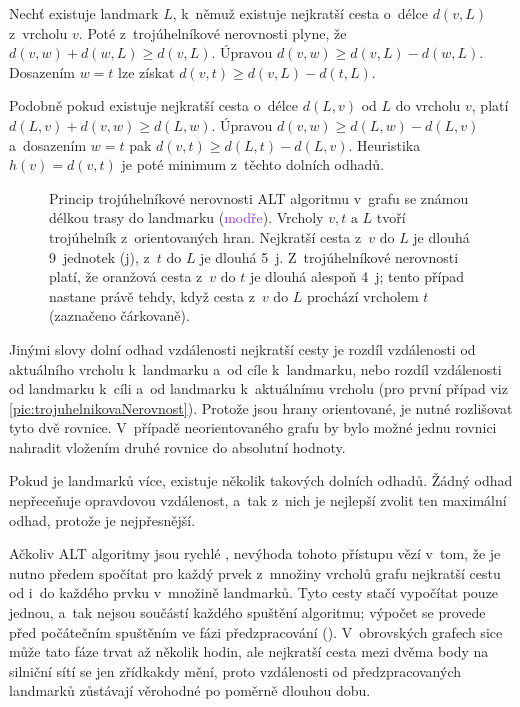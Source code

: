 Nechť existuje landmark $L$, k~němuž existuje nejkratší cesta o~délce $d(v,L)$ z~vrcholu $v$. Poté z~trojúhelníkové nerovnosti plyne, že $d(v,w) + d(w,L) \geq d(v,L)$. Úpravou $d(v,w) \geq d(v,L) - d(w,L)$. Dosazením $w = t$ lze získat $d(v,t) \geq d(v,L) - d(t,L)$.

Podobně pokud existuje nejkratší cesta o~délce $d(L,v)$ od \(L\) do vrcholu \(v\), platí $d(L,v) + d(v,w) \geq d(L,w)$. Úpravou $d(v,w) \geq d(L,w) - d(L,v)$ a~dosazením $w = t$ pak $d(v,t) \geq d(L,t) - d(L,v)$. Heuristika \(h(v) = d(v,t)\) je poté minimum z~těchto dolních odhadů.

\begin{figure}[htbp]
	\centering
	\trojuhelnikovaNerovnost
	\caption[Princip trojúhelníkové nerovnosti ALT algoritmu.]{Princip trojúhelníkové nerovnosti ALT algoritmu v~grafu se známou délkou trasy do landmarku (\textcolor{BlueViolet}{modře}). Vrcholy \(v, t \text{ a~} L\) tvoří trojúhelník z~orientovaných hran. Nejkratší cesta z~\(v \text{ do } L\) je dlouhá 9~jednotek (j), z~\(t \text{ do } L\) je dlouhá 5~j. Z~trojúhelníkové nerovnosti platí, že \textcolor{RedOrange}{oranžová} cesta z~\(v \text{ do } t\) je dlouhá alespoň 4~j; tento případ nastane právě tehdy, když cesta z~\(v \text{ do } L \text{ prochází vrcholem } t\) (zaznačeno čárkovaně).}
	\label{pic:trojuhelnikovaNerovnost}
\end{figure}

\renewcommand{\figureautorefname}{obrázek}
Jinými slovy dolní odhad vzdálenosti nejkratší cesty je rozdíl vzdálenosti od aktuálního vrcholu k~landmarku a~od cíle k~landmarku, nebo rozdíl vzdálenosti od landmarku k~cíli a~od landmarku k~aktuálnímu vrcholu (pro první případ viz \autoref{pic:trojuhelnikovaNerovnost}). Protože jsou hrany orientované, je nutné rozlišovat tyto dvě rovnice. V~případě neorientovaného grafu by bylo možné jednu rovnici nahradit vložením druhé rovnice do absolutní hodnoty.

Pokud je landmarků více, existuje několik takových dolních odhadů. Žádný odhad nepřeceňuje opravdovou vzdálenost, a~tak z~nich je nejlepší zvolit ten maximální odhad, protože je nejpřesnější. 
\renewcommand{\figureautorefname}{obrázku}

Ačkoliv ALT algoritmy jsou rychlé \cite{bauer2011experimental}, nevýhoda tohoto přístupu vězí v~tom, že je nutno předem spočítat pro každý prvek z~množiny vrcholů grafu nejkratší cestu od i~do každého prvku v~množině landmarků. Tyto cesty stačí vypočítat pouze jednou, a~tak nejsou součástí každého spuštění algoritmu; výpočet se provede před počátečním spuštěním ve fázi předzpracování (). V~obrovských grafech sice může tato fáze trvat až několik hodin, ale nejkratší cesta mezi dvěma body na silniční sítí se jen zřídkakdy mění, proto vzdálenosti od předzpracovaných landmarků zůstávají věrohodné po poměrně dlouhou dobu.

